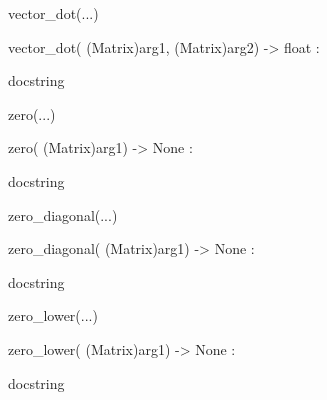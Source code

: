\documentclass[letterpaper,10pt,english]{sphinxmanual}
\begin{document}
\begin{description}
\begin{description}
\begin{DUlineblock}{0em}
\begin{DUlineblock}{\DUlineblockindent}
\end{DUlineblock}
\item[] vector\_dot(...)
\item[]
\begin{DUlineblock}{\DUlineblockindent}
\item[] vector\_dot( (Matrix)arg1, (Matrix)arg2) -\textgreater{} float :
\item[]
\begin{DUlineblock}{\DUlineblockindent}
\item[] docstring
\item[] 
\end{DUlineblock}
\end{DUlineblock}
\item[] zero(...)
\item[]
\begin{DUlineblock}{\DUlineblockindent}
\item[] zero( (Matrix)arg1) -\textgreater{} None :
\item[]
\begin{DUlineblock}{\DUlineblockindent}
\item[] docstring
\item[] 
\end{DUlineblock}
\end{DUlineblock}
\item[] zero\_diagonal(...)
\item[]
\begin{DUlineblock}{\DUlineblockindent}
\item[] zero\_diagonal( (Matrix)arg1) -\textgreater{} None :
\item[]
\begin{DUlineblock}{\DUlineblockindent}
\item[] docstring
\item[] 
\end{DUlineblock}
\end{DUlineblock}
\item[] zero\_lower(...)
\item[]
\begin{DUlineblock}{\DUlineblockindent}
\item[] zero\_lower( (Matrix)arg1) -\textgreater{} None :
\item[]
\begin{DUlineblock}{\DUlineblockindent}
\item[] docstring
\item[] 
\end{DUlineblock}
\end{DUlineblock}

\end{DUlineblock}
\end{description}
\end{description}
\end{document}

